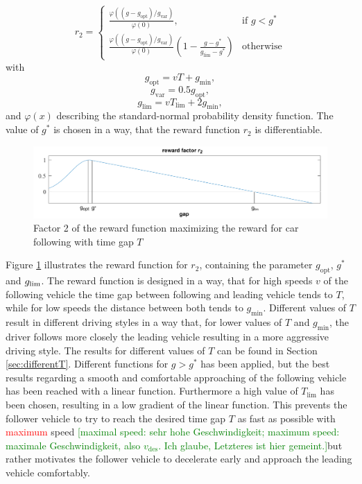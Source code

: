 \documentclass[review]{elsarticle}
\providecommand{\red}[1]{\textcolor{red}{#1}}
\providecommand{\green}[1]{\textcolor{green}{#1}}
\providecommand{\martin}[1]{\red{#1}} %
\providecommand{\martinc}[1]{\green{[#1]}} %
\providecommand{\sub}[1]{_{\mathrm{#1}}}  %
\providecommand{\3}{{\ss}}
\begin{document}
\begin{equation}
\label{eq:r2_CFP}
r_2  = 
\begin{cases}
\frac{\varphi((g-g\sub{opt})/g\sub{var})}{\varphi(0)},
& \text{if } g < g^*\\
\frac{\varphi((g-g\sub{opt})/g\sub{var})}{\varphi(0)}
\left(1-\frac{g-g^*}{g\sub{lim} - g^*}\right)  & \text{otherwise}
\end{cases}
\end{equation}
with 
\begin{equation}
\label{eq:r21}
g\sub{opt} = vT + g\sub{min},
\end{equation}
\begin{equation}
\label{eq:r22}
g\sub{var} = 0.5g\sub{opt},
\end{equation}
\begin{equation}
\label{eq:r23}
g\sub{lim} = vT\sub{lim} + 2g\sub{min},
\end{equation}
%
and $\varphi(x)$ describing the standard-normal probability density
function. The value of $g^*$ is chosen in a way, that the reward function $r_2$ is differentiable.
%
\begin{figure}
	\centering
	\includegraphics[width=12cm]{images/RewardFunc1}
	\caption{Factor 2 of the reward function maximizing the reward
		for car following with time gap $T$} 
	\label{fig:RewardFunc1}
\end{figure}
%
Figure \ref{fig:RewardFunc1} illustrates the reward function for
$r_2$, containing the parameter $g\sub{opt}$, $g^*$ and $g_{\rm
	lim}$. The reward function is designed in a way, that for high speeds $v$
of the following vehicle the time gap between following and leading
vehicle tends to $T$, while for low speeds the distance
between both tends to $g\sub{min}$. Different values of $T$
result in different driving styles in a way that, for lower values of
$T$ and $g\sub{min}$, the driver follows
more closely the leading vehicle resulting in a more aggressive
driving style. The results for different values of $T$ can
be found in Section \ref{sec:differentT}. Different functions for $g
> g^*$ has been applied, but the best results regarding a smooth and
comfortable approaching of the following vehicle has been reached with
a linear function. Furthermore a high value of $T\sub{lim}$ has been
chosen, resulting in a low gradient of the linear function. This
prevents the follower vehicle to try to reach the desired time gap $T$
as fast as possible with \martin{maximum} speed \martinc{maximal
  speed: sehr hohe Geschwindigkeit; maximum speed: maximale
  Geschwindigkeit, also $v\sub{des}$. Ich glaube, Letzteres ist hier gemeint.}but rather motivates the follower vehicle to decelerate early and approach the leading vehicle comfortably.
\end{document}
